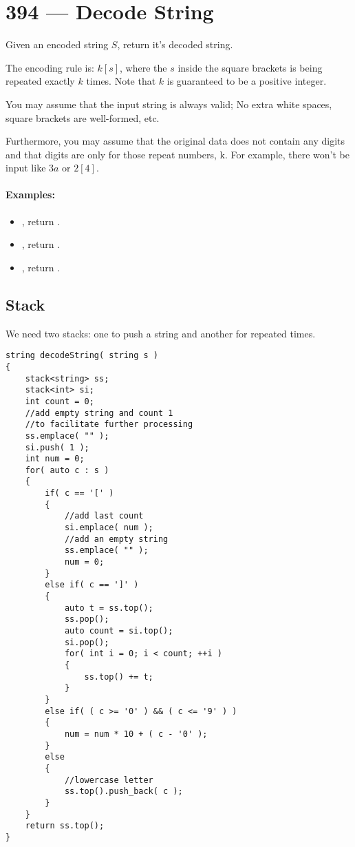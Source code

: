 \section{394 --- Decode String}
Given an encoded string $S$, return it's decoded string.
\par
The encoding rule is: $k[s]$, where the $s$ inside the square brackets is being repeated exactly $k$ times. Note that $k$ is guaranteed to be a positive integer.
\par
You may assume that the input string is always valid; No extra white spaces, square brackets are well-formed, etc.
\par
Furthermore, you may assume that the original data does not contain any digits and that digits are only for those repeat numbers, k. For example, there won't be input like $3a$ or $2[4]$.

\paragraph{Examples:}

\begin{itemize}
\item {}, return .
\item {}, return .
\item {}, return .
\end{itemize}


\subsection{Stack}
We need two stacks: one to push a string and another for repeated times.

\setcounter{lstlisting}{0}
\begin{lstlisting}[style=customc, caption={Iterative}]
string decodeString( string s )
{
    stack<string> ss;
    stack<int> si;
    int count = 0;
    //add empty string and count 1
    //to facilitate further processing
    ss.emplace( "" );
    si.push( 1 );
    int num = 0;
    for( auto c : s )
    {
        if( c == '[' )
        {
            //add last count
            si.emplace( num );
            //add an empty string
            ss.emplace( "" );
            num = 0;
        }
        else if( c == ']' )
        {
            auto t = ss.top();
            ss.pop();
            auto count = si.top();
            si.pop();
            for( int i = 0; i < count; ++i )
            {
                ss.top() += t;
            }
        }
        else if( ( c >= '0' ) && ( c <= '9' ) )
        {
            num = num * 10 + ( c - '0' );
        }
        else
        {
            //lowercase letter
            ss.top().push_back( c );
        }
    }
    return ss.top();
}
\end{lstlisting}

